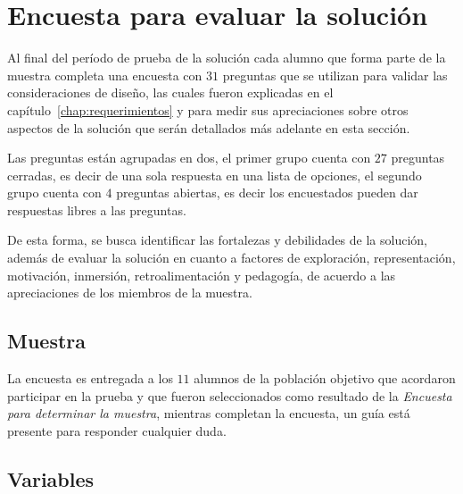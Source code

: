 
\section{Encuesta para evaluar la solución}
\label{sec:subjetiva}

Al final del período de prueba de la solución cada alumno que forma parte de la muestra
completa una encuesta con $31$ preguntas que se utilizan para validar las
consideraciones de diseño, las cuales fueron explicadas en el capítulo~\ref{chap:requerimientos}
y para medir sus apreciaciones sobre otros aspectos de la solución que serán
detallados más adelante en esta sección. 

Las preguntas están agrupadas en dos, el primer grupo cuenta con $27$ preguntas
cerradas, es decir de una sola respuesta en una lista de opciones, el segundo
grupo cuenta con $4$ preguntas abiertas, es decir los encuestados pueden dar
respuestas libres a las preguntas. 

De esta forma, se busca identificar las fortalezas y debilidades de la solución,
además de evaluar la solución en cuanto a factores de exploración,
representación, motivación, inmersión, retroalimentación y pedagogía, de acuerdo
a las apreciaciones de los miembros de la muestra.

\subsection{Muestra}

La encuesta es entregada a los $11$ alumnos de la población objetivo que acordaron
participar en la prueba y que fueron seleccionados como resultado de la 
\emph{Encuesta para determinar la muestra}, mientras completan la encuesta, un guía está presente
para responder cualquier duda.


\subsection{Variables}
\label{sec:variables}


